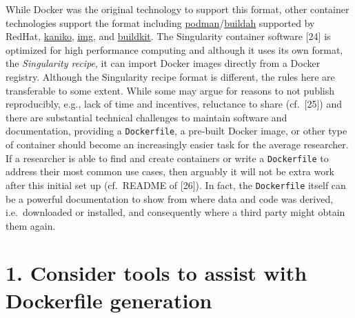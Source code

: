 \documentclass[10pt,letterpaper]{article}
\begin{document}
While Docker was the original technology to support this format, other
container technologies support the format including
\href{https://podman.io/}{podman}/\href{https://github.com/containers/buildah}{buildah}
supported by RedHat,
\href{https://github.com/GoogleContainerTools/kaniko}{kaniko},
\href{https://github.com/genuinetools/img}{img}, and
\href{https://github.com/moby/buildkit}{buildkit}. The Singularity
container software {[}24{]} is optimized for high performance computing
and although it uses its own format, the \emph{Singularity recipe}, it
can import Docker images directly from a Docker registry. Although the
Singularity recipe format is different, the rules here are transferable
to some extent. While some may argue for reasons to not publish
reproducibly, e.g., lack of time and incentives, reluctance to share
(cf.~{[}25{]}) and there are substantial technical challenges to
maintain software and documentation, providing a \texttt{Dockerfile}, a
pre-built Docker image, or other type of container should become an
increasingly easier task for the average researcher. If a researcher is
able to find and create containers or write a \texttt{Dockerfile} to
address their most common use cases, then arguably it will not be extra
work after this initial set up (cf.~README of {[}26{]}). In fact, the
\texttt{Dockerfile} itself can be a powerful documentation to show from
where data and code was derived, i.e.~downloaded or installed, and
consequently where a third party might obtain them again.

\hypertarget{consider-tools-to-assist-with-dockerfile-generation}{%
\section*{1. Consider tools to assist with Dockerfile
generation}\label{consider-tools-to-assist-with-dockerfile-generation}}

  \label{rule:tools} 
\end{document}
